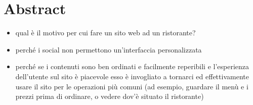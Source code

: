 \documentclass[../relazione.tex]{subfiles}
\begin{document}
\section{Abstract}
	\begin{itemize}
		\item qual è il motivo per cui fare un sito web ad un ristorante?
		\item perché i social non permettono un'interfaccia personalizzata
		\item perché se i contenuti sono ben ordinati e facilmente reperibili e l'esperienza dell'utente sul sito è piacevole esso è invogliato a tornarci ed effettivamente usare il sito per le operazioni più comuni (ad esempio, guardare il menù e i prezzi prima di ordinare, o vedere dov'è situato il ristorante)
	\end{itemize}
\end{document}
